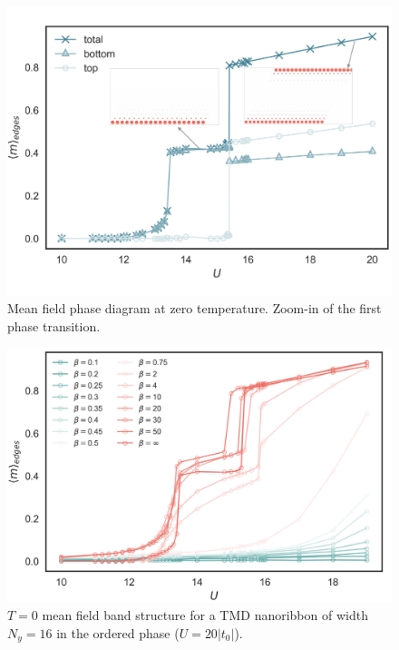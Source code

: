 \begin{figure}[H]
\includegraphics[trim={0cm 1.7cm 0cm 1.7cm},clip, scale =0.21]{images/edge-mag.pdf}
	\caption[Mean field phase diagram at zero temperature. Zoom-in of the first phase transition.]{Mean field phase diagram at zero temperature. Zoom-in of the first phase transition.
	\label{fig:zeroTphaseDiagram}}
\end{figure}

\begin{figure}[H]
\centering
\includegraphics[scale =0.5]{images/edge-mag-phase-diagram.png}
	\caption[$T=0$ mean field band structure for a TMD nanoribbon of width $N_y = 16$ in the ordered phase, at $U=20 | t_0 |$.]{$T=0$ mean field band structure for a TMD nanoribbon of width $N_y = 16$ in the ordered phase ($U=20 | t_0 |$).}
	\label{fig:bandsZoomed}
\end{figure}

